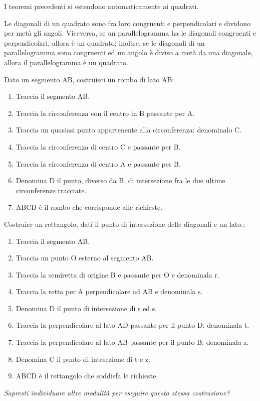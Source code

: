 I teoremi precedenti si estendono automaticamente ai quadrati.
\begin{corollario}
Le diagonali di un quadrato sono fra loro congruenti e perpendicolari 
e dividono per metà gli angoli. Viceversa, se un parallelogramma ha 
le diagonali congruenti e perpendicolari, allora è un quadrato; 
inoltre, se le diagonali di un parallelogramma sono congruenti ed un 
angolo è diviso a metà da una diagonale, allora il parallelogramma è 
un quadrato.
\end{corollario}

\begin{procedura}
Dato un segmento AB, costruisci un rombo di lato AB:
\begin{enumerate} [nosep]
\item 
Traccia il segmento AB. 
\item 
Traccia la circonferenza con il centro in B passante per A.
\item 
Traccia un quasiasi punto appartenente alla circonferenza: denominalo C.
\item 
Traccia la circonferenza di centro C e passante per B.
\item 
Traccia la circonferenza di centro A e passante per B.
\item 
Denomina D il punto, diverso da B, di intersezione  fra le due ultime 
circonferenze tracciate.
\item 
ABCD è il rombo che corrisponde alle richieste.
\end{enumerate}
\end{procedura}



\begin{procedura}
Costruire un rettangolo, dati il punto di intersezione delle diagonali e un 
lato.:
\begin{enumerate} [nosep]
\item 
Traccia il segmento AB.
\item 
Traccia un punto O esterno al segmento AB.
\item 
Traccia la semiretta di origine B e passante per O e denominala r.
\item 
Traccia la retta per A perpendicolare ad AB e denominala s.
\item
Denomina D il punto di intersezione di r ed s.
\item
Traccia la perpendicolare al lato AD passante per il punto D: denominala t.
\item
Traccia la perpendicolare al lato AB passante per il punto B: denominala z.
\item
Denomina C il punto di intesezione di t e z.
\item 
ABCD è il rettangolo che soddisfa le richieste.
\end{enumerate}
\textit{Sapresti individuare altre modalità per eseguire questa stessa 
costruzione? }
\end{procedura}

